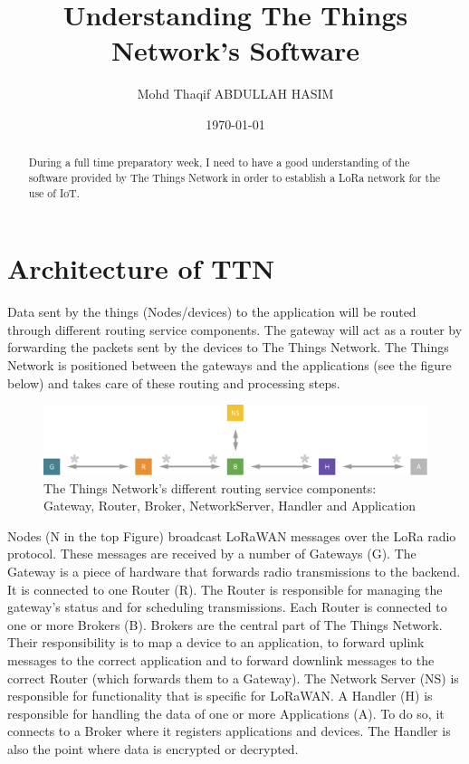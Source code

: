 \documentclass[a4paper]{article}
\title{Understanding The Things Network's Software}
\author{Mohd Thaqif ABDULLAH HASIM}
\date{\today}
\begin{document}
\maketitle

\begin{abstract}
During a full time preparatory week, I need to have a good understanding of the software provided by The Things Network in order to establish a LoRa network for the use of IoT.
\end{abstract}

\section{Architecture of TTN}
\label{sec:introduction}

Data sent by the things (Nodes/devices) to the application will be routed through different routing service components. The gateway will act as a router by forwarding the packets sent by the devices to The Things Network. 
The Things Network is positioned between the gateways and the applications (see the figure below) and takes care of these routing and processing steps.

\begin{figure}[h]
\centering
\includegraphics[width=1\textwidth]{Routing-Services.png}
\caption{\label{fig:Routing-Services}The Things Network’s different routing service components:
Gateway, Router, Broker, NetworkServer, Handler and Application}
\end{figure}

Nodes (N in the top Figure) broadcast LoRaWAN messages over the LoRa radio protocol. 
These messages are received by a number of Gateways (G). 
The Gateway is a piece of hardware that forwards radio transmissions to the backend. 
It is connected to one Router (R). 
The Router is responsible for managing the gateway's status and for scheduling transmissions. 
Each Router is connected to one or more Brokers (B). 
Brokers are the central part of The Things Network. 
Their responsibility is to map a device to an application, to forward uplink messages to the correct application and to forward downlink messages to the correct Router (which forwards them to a Gateway). 
The Network Server (NS) is responsible for functionality that is specific for LoRaWAN. 
A Handler (H) is responsible for handling the data of one or more Applications (A). 
To do so, it connects to a Broker where it registers applications and devices. 
The Handler is also the point where data is encrypted or decrypted.
\end{document}
